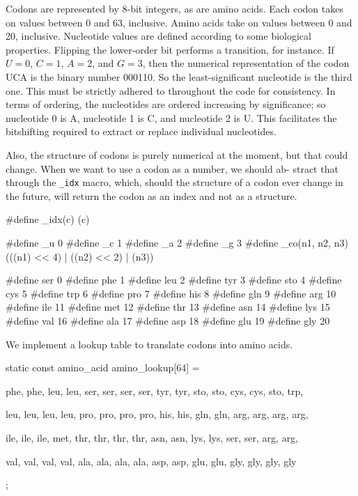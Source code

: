 \documentclass{article}
\begin{document}
      Codons are represented by 8-bit integers, as are amino acids. Each codon
      takes on values between 0 and 63, inclusive. Amino acids take on values
      between 0 and 20, inclusive. Nucleotide values are defined according to
      some biological properties. Flipping the lower-order bit performs a
      transition, for instance. If $U = 0$, $C = 1$, $A = 2$, and $G = 3$, then
      the numerical representation of the codon UCA is the binary number 000110.
      So the least-significant nucleotide is the third one. This must be
      strictly adhered to throughout the code for consistency. In terms of
      ordering, the nucleotides are ordered increasing by significance; so
      nucleotide 0 is A, nucleotide 1 is C, and nucleotide 2 is U. This
      facilitates the bitshifting required to extract or replace individual
      nucleotides.
      
      Also, the structure of codons is purely numerical at the moment, but that
      could change. When we want to use a codon as a number, we should ab-
      stract that through the \verb|_idx| macro, which, should the structure of
      a codon ever change in the future, will return the codon as an index and
      not as a structure.

\begin{ccode}
#define _idx(c) (c)

#define _u 0
#define _c 1
#define _a 2
#define _g 3
#define _co(n1, n2, n3) (((n1) << 4) | ((n2) << 2) | (n3))

#define ser 0
#define phe 1
#define leu 2
#define tyr 3
#define sto 4
#define cys 5
#define trp 6
#define pro 7
#define his 8
#define gln 9
#define arg 10
#define ile 11
#define met 12
#define thr 13
#define asn 14
#define lys 15
#define val 16
#define ala 17
#define asp 18
#define glu 19
#define gly 20
\end{ccode}

      We implement a lookup table to translate codons into amino acids.

\begin{ccode}
static const amino_acid amino_lookup[64] = {
    phe, phe, leu, leu,
    ser, ser, ser, ser,
    tyr, tyr, sto, sto,
    cys, cys, sto, trp,

    leu, leu, leu, leu,
    pro, pro, pro, pro,
    his, his, gln, gln,
    arg, arg, arg, arg,

    ile, ile, ile, met,
    thr, thr, thr, thr,
    asn, asn, lys, lys,
    ser, ser, arg, arg,

    val, val, val, val,
    ala, ala, ala, ala,
    asp, asp, glu, glu,
    gly, gly, gly, gly};
\end{ccode}
\end{document}
